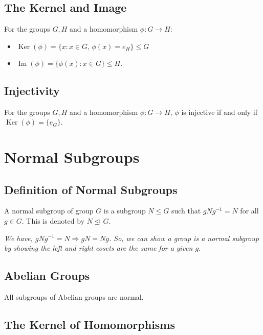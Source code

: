 \documentclass[a4paper, 12pt, twoside]{article}
\DeclareMathOperator{\Ker}{Ker}
\DeclareMathOperator{\Ima}{Im}
\begin{document}
\subsection{The Kernel and Image}

For the groups $G, H$ and a homomorphism $\phi : G \to H$:

\begin{itemize}
      \item $\Ker(\phi) = \{x : x \in G, \, \phi(x) = e_H\} \leq G$
      \item $\Ima(\phi) = \{\phi(x) : x \in G\} \leq H$.
\end{itemize}

\subsection{Injectivity}

For the groups $G, H$ and a homomorphism $\phi : G \to H$,
$\phi$ is injective if and only if $\Ker(\phi) = \{e_G\}$.

\newpage

\section{Normal Subgroups}

\subsection{Definition of Normal Subgroups}

A normal subgroup of group $G$ is a subgroup $N \leq G$
such that $gNg^{-1} = N$ for all $g \in G$. This is denoted by
$N \unlhd \, G$.

\vspace{\baselineskip}

\textit{We have, $gNg^{-1} = N \Rightarrow gN = Ng$. So, we can show a
group is a normal subgroup by showing the left and right
cosets are the same for a given $g$.}

\subsection{Abelian Groups}

All subgroups of Abelian groups are normal.

\subsection{The Kernel of Homomorphisms}
\end{document}
